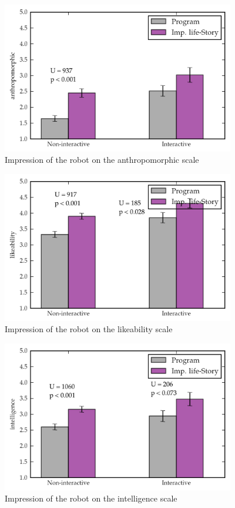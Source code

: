    \begin{figure}[thpb]
      \centering
      \includegraphics[width=4in]{figures/study/rev2/godspeed/anthropomorphic.png}
      \caption{Impression of the robot on the anthropomorphic scale}
      \label{fig_study_anthropomorphic}
   \end{figure}


   \begin{figure}[thpb]
      \centering
      \includegraphics[width=4in]{figures/study/rev2/godspeed/likeability.png}
      \caption{Impression of the robot on the likeability scale}
      \label{fig_study_likeability}
   \end{figure}

   \begin{figure}[thpb]
      \centering
      \includegraphics[width=4in]{figures/study/rev2/godspeed/intelligence.png}
      \caption{Impression of the robot on the intelligence scale}
      \label{fig_study_intelligence}
   \end{figure}


